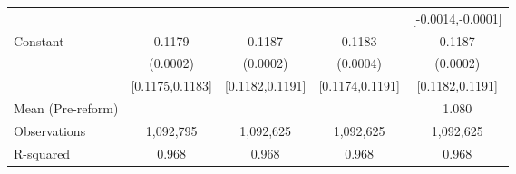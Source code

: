{\begin{tabular}{l*{4}{c}}
                    &                     &                     &                     &[-0.0014,-0.0001]         \\
Constant            &      0.1179\sym{***}&      0.1187\sym{***}&      0.1183\sym{***}&      0.1187\sym{***}\\
                    &    (0.0002)         &    (0.0002)         &    (0.0004)         &    (0.0002)         \\
                    &[0.1175,0.1183]         &[0.1182,0.1191]         &[0.1174,0.1191]         &[0.1182,0.1191]         \\
\midrule
Mean (Pre-reform)   &                     &                     &                     &       1.080         \\
Observations        &   1,092,795         &   1,092,625         &   1,092,625         &   1,092,625         \\
R-squared           &       0.968         &       0.968         &       0.968         &       0.968         \\
\bottomrule
\end{tabular}
}
